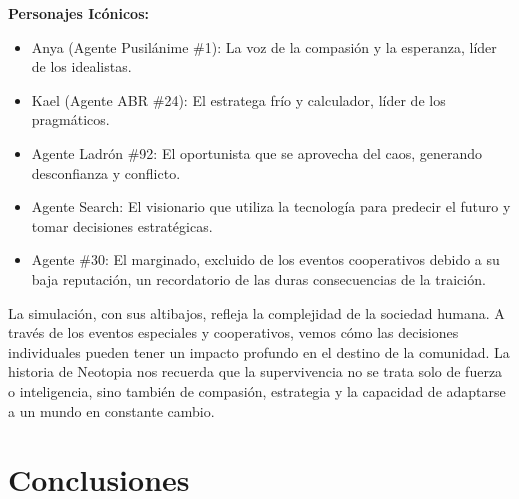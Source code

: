 \documentclass{article}
\begin{document}
\begin{tcolorbox}[enhanced, breakable,skin first=enhanced, skin middle=enhanced, skin last=enhanced]
      \textbf{Personajes Icónicos:}
      \begin{itemize}
            \item Anya (Agente Pusilánime \#1): La voz de la compasión y la esperanza, líder de los idealistas.
            \item Kael (Agente ABR \#24): El estratega frío y calculador, líder de los pragmáticos.
            \item Agente Ladrón \#92: El oportunista que se aprovecha del caos, generando desconfianza y conflicto.
            \item Agente Search: El visionario que utiliza la tecnología para predecir el futuro y tomar decisiones estratégicas.
            \item Agente \#30: El marginado, excluido de los eventos cooperativos debido a su baja reputación, un recordatorio de las duras consecuencias de la traición.
      \end{itemize}
      La simulación, con sus altibajos, refleja la complejidad de la sociedad humana. A través de los eventos especiales y cooperativos, vemos cómo las decisiones individuales pueden tener un impacto profundo en el destino de la comunidad. La historia de Neotopia nos recuerda que la supervivencia no se trata solo de fuerza o inteligencia, sino también de compasión, estrategia y la capacidad de adaptarse a un mundo en constante cambio.

\end{tcolorbox}
\newpage
\section{Conclusiones}
\end{document}
